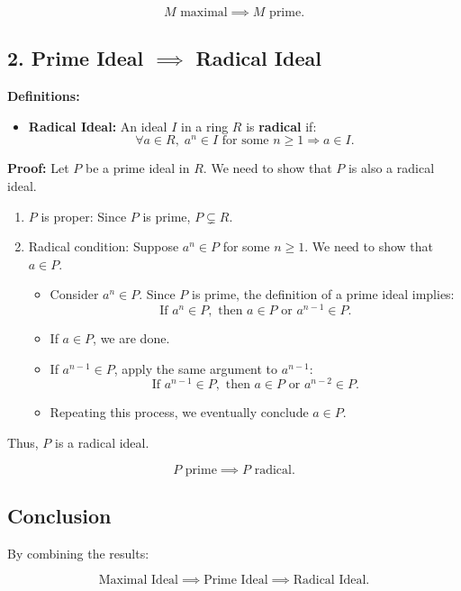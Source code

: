 \documentclass[11pt,openany]{article}
\begin{document}
\[
M \text{ maximal} \implies M \text{ prime}.
\]

\subsection*{2. Prime Ideal \( \implies \) Radical Ideal}

\textbf{Definitions:}
\begin{itemize}
	\item \textbf{Radical Ideal:} An ideal \( I \) in a ring \( R \) is \textbf{radical} if:
	\[
	\forall a \in R, \; a^n \in I \text{ for some } n \geq 1 \Rightarrow a \in I.
	\]
\end{itemize}

\textbf{Proof:} Let \( P \) be a prime ideal in \( R \). We need to show that \( P \) is also a radical ideal.

\begin{enumerate}
	\item \( P \) is proper: Since \( P \) is prime, \( P \subsetneq R \).
	
	\item Radical condition: Suppose \( a^n \in P \) for some \( n \geq 1 \). We need to show that \( a \in P \).
	
	\begin{itemize}
		\item Consider \( a^n \in P \). Since \( P \) is prime, the definition of a prime ideal implies:
		\[
		\text{If } a^n \in P, \text{ then } a \in P \text{ or } a^{n-1} \in P.
		\]
		\item If \( a \in P \), we are done.
		\item If \( a^{n-1} \in P \), apply the same argument to \( a^{n-1} \):
		\[
		\text{If } a^{n-1} \in P, \text{ then } a \in P \text{ or } a^{n-2} \in P.
		\]
		\item Repeating this process, we eventually conclude \( a \in P \).
	\end{itemize}
\end{enumerate}

Thus, \( P \) is a radical ideal.

\[
P \text{ prime} \implies P \text{ radical}.
\]

\subsection*{Conclusion}
By combining the results:

\[
\text{Maximal Ideal} \implies \text{Prime Ideal} \implies \text{Radical Ideal}.
\]
\end{document}
